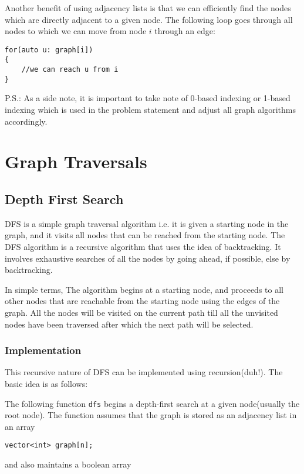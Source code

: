 \documentclass[twoside,12pt,a4paper,english]{book}
\theoremstyle{definition}
\theoremstyle{problemstyle}
\begin{document}
Another benefit of using adjacency lists is that we can efficiently find the nodes which are directly adjacent to a given node. The following loop goes through all nodes to which we can move from node $i$ through an edge:

\begin{lstlisting}
for(auto u: graph[i])
{
    //we can reach u from i
}
\end{lstlisting}

P.S.: As a side note, it is important to take note of 0-based indexing or 1-based indexing which is used in the problem statement and adjust all graph algorithms accordingly.

\part{Graph Traversals}

\chapter{Depth First Search}
DFS is a simple graph traversal algorithm i.e. it is given a starting node in the graph, and it visits all nodes that can be reached from the starting node. The DFS algorithm is a recursive algorithm that uses the idea of backtracking. It involves exhaustive searches of all the nodes by going ahead, if possible, else by backtracking.

In simple terms, The algorithm begins at a starting node, and proceeds to all other nodes that are reachable from the starting node using the edges of the graph. All the nodes will be visited on the current path till all the unvisited nodes have been traversed after which the next path will be selected.

\section{Implementation}

This recursive nature of DFS can be implemented using recursion(duh!). The basic idea is as follows:

The following function \texttt{dfs} begins a depth-first search at a given node(usually the root node). The function assumes that the graph is stored as an adjacency list in an array

\begin{lstlisting}
vector<int> graph[n];
\end{lstlisting}

and also maintains a boolean array
\end{document}

